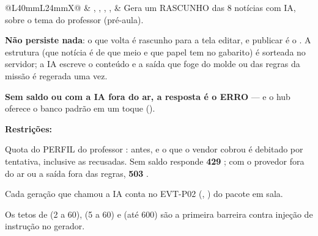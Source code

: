 \begin{tabularx}{\linewidth}{@{}L{40mm}L{24mm}X@{}}
\zebra {} & , , , ,  & Gera um RASCUNHO das 8 notícias com IA, sobre o tema do professor (pré-aula).\par \textbf{Não persiste nada}: o que volta é rascunho para a tela editar, e publicar é o . A estrutura (que notícia é de que meio e que papel tem no gabarito) é sorteada no servidor; a IA escreve o conteúdo e a saída que foge do molde ou das regras da missão é regerada uma vez.\par \textbf{Sem saldo ou com a IA fora do ar, a resposta é o ERRO} --- e o hub oferece o banco padrão em um toque ().\par \textbf{Restrições:}\par \hspace*{1em}\textbullet{} Quota do PERFIL do professor :  antes, e o que o vendor cobrou é debitado por tentativa, inclusive as recusadas. Sem saldo responde \textbf{429} ; com o provedor fora do ar ou a saída fora das regras, \textbf{503} .\par \hspace*{1em}\textbullet{} Cada geração que chamou a IA conta no EVT-P02 (, ) do pacote em sala.\par \hspace*{1em}\textbullet{} Os tetos de  (2 a 60),  (5 a 60) e  (até 600) são a primeira barreira contra injeção de instrução no gerador.\\

\end{tabularx}
